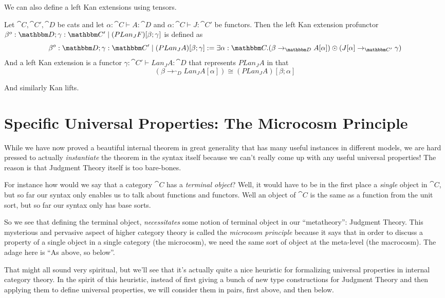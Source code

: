 \documentclass{article}
\begin{document}
We can also define a left Kan extensions using tensors.
\begin{definition}
  Let $\cat C,\cat C',\cat D$ be cats and let $\alpha:\cat C \vdash A
  : \cat D$ and $\alpha : \cat C \vdash J : \cat C'$ be functors.
  Then the left Kan extension profunctor $\beta^o:\cat D; \gamma:\cat
  C' \pipe (PLan_J F)[\beta;\gamma]$ is defined as
  \[
  \beta^o:\cat D; \gamma:\cat C' \pipe (PLan_J A)[\beta;\gamma] :=
  \exists \alpha:\cat C. (\beta \to_{\cat D} A[\alpha]) \odot (J[\alpha] \to_{\cat C'} \gamma)
  \]
  And a left Kan extension is a functor $\gamma :\cat C' \vdash Lan_J
  A : \cat D$ that represents $PLan_J A$ in that
  \[ (\beta \to_{\cat D} Lan_J A[\alpha]) \cong (PLan_J A)[\beta;\alpha] \]
\end{definition}

And similarly Kan lifts.

\section{Specific Universal Properties: The Microcosm Principle}

While we have now proved a beautiful internal theorem in great
generality that has many useful instances in different models, we are
hard pressed to actually \emph{instantiate} the theorem in the syntax
itself because we can't really come up with any useful universal properties!
The reason is that Judgment Theory itself is too bare-bones.

For instance how would we say that a category $\cat C$ has a
\emph{terminal object}? Well, it would have to be in the first place a
\emph{single} object in $\cat C$, but so far our syntax only enables
us to talk about functions and functors. Well an object of $\cat C$ is
the same as a function from the unit sort, but so far our syntax only
has base sorts.

So we see that defining the terminal object, \emph{necessitates} some
notion of terminal object in our ``metatheory'': Judgment Theory.
This mysterious and pervasive aspect of higher category theory is
called the \emph{microcosm principle} because it says that in order to
discuss a property of a single object in a single category (the
microcosm), we need the same sort of object at the meta-level (the
macrocosm). The adage here is ``As above, so below''.

That might all sound very spiritual, but we'll see that it's actually
quite a nice heuristic for formalizing universal properties in
internal category theory.
%
In the spirit of this heuristic, instead of first giving a bunch of
new type constructions for Judgment Theory and then applying them to
define universal properties, we will consider them in pairs, first
above, and then below.
\end{document}
